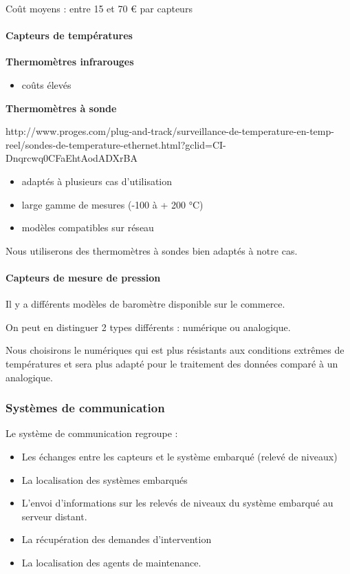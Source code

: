 \documentclass{mise_en_page}
\begin{document}
Coût moyens : entre 15 et 70 € par capteurs

\paragraph{Capteurs de températures}

\textbf{Thermomètres infrarouges}
\begin{itemize}
\item coûts élevés
\end{itemize}
\textbf{Thermomètres à sonde}

http://www.proges.com/plug-and-track/surveillance-de-temperature-en-temp-reel/sondes-de-temperature-ethernet.html?gclid=CI-Dnqrcwq0CFaEhtAodADXrBA

\begin{itemize}
\item adaptés à plusieurs cas d’utilisation
\item large gamme de mesures (-100 à + 200 °C)
\item modèles compatibles sur réseau
\end{itemize}

Nous utiliserons des thermomètres à sondes bien adaptés à notre cas.

\paragraph{Capteurs de mesure de pression}

Il y a différents modèles de baromètre disponible sur le commerce.

On peut en distinguer 2 types différents : numérique ou analogique.

Nous choisirons le numériques qui est plus résistants aux conditions
extrêmes de températures et sera plus adapté pour le traitement des
données comparé à un analogique.

\subsubsection{Systèmes de communication}
Le système de communication regroupe :

\begin{itemize}
\item Les échanges entre les capteurs et le système embarqué (relevé de
niveaux)
\item La localisation des systèmes embarqués
\item L’envoi d’informations sur les relevés de niveaux du système
embarqué au serveur distant.
\item La récupération des demandes d’intervention
\item La localisation des agents de maintenance.
\end{itemize}
\end{document}
